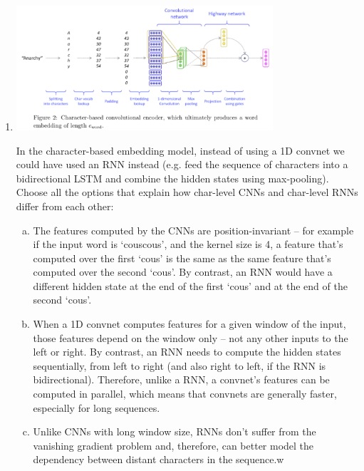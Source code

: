 \begin{enumerate}[1.]

\item {}

\begin{center}
\includegraphics[width=0.75\textwidth]{4-1.png}
\end{center}

In the character-based embedding model, instead of using a 1D convnet we could have used an RNN instead (e.g. feed the sequence of characters into a bidirectional LSTM and combine the hidden states using max-pooling). Choose all the options that explain how char-level CNNs and char-level RNNs differ from each other:

\begin{enumerate}[(a)]
\item The features computed by the CNNs are position-invariant -- for example if the input word is `couscous', and the kernel size is 4, a feature that's computed over the first `cous' is the same as the same feature that's computed over the second `cous'. By contrast, an RNN would have a different hidden state at the end of the first `cous' and at the end of the second `cous'.
\item When a 1D convnet computes features for a given window of the input, those features depend on the window only -- not any other inputs to the left or right. By contrast, an RNN needs to compute the hidden states sequentially, from left to right (and also right to left, if the RNN is bidirectional). Therefore, unlike a RNN, a convnet's features can be computed in parallel, which means that convnets are generally faster, especially for long sequences.
\item Unlike CNNs with long window size, RNNs don't suffer from the vanishing gradient problem and, therefore, can better model the dependency between distant characters in the sequence.w
\end{enumerate}


\end{enumerate}